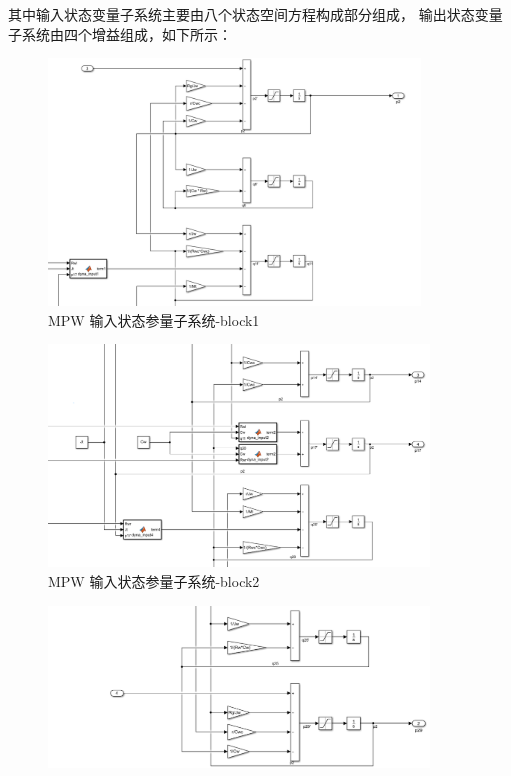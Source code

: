 \begin{itemize}
	其中输入状态变量子系统主要由八个状态空间方程构成部分组成，	输出状态变量子系统由四个增益组成，如下所示：
	\begin{figure}[htbp]
		\centering
		\includegraphics[width=0.88\textwidth]{fig/simulink/MPW_simulink_block1.png}
		\caption{MPW 输入状态参量子系统-block1}
	\end{figure}
	\begin{figure}[ht]
		\centering
		\includegraphics[width=0.9\textwidth]{fig/simulink/MPW_simulink_block2.png}
		\caption{MPW 输入状态参量子系统-block2}
	\end{figure}
	\begin{figure}[ht]
		\centering
		\includegraphics[width=0.9\textwidth]{fig/simulink/MPW_simulink_block3.png}

\end{figure}
\end{itemize}
